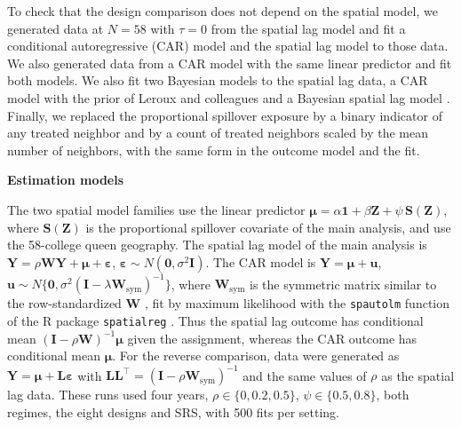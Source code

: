 \documentclass[11pt]{article}
\newcommand{\sihead}[1]{\par\medskip\noindent\textbf{#1}\par\nopagebreak\noindent\ignorespaces}
\begin{document}
To check that the design comparison does not depend on the spatial model, we generated data at $N = 58$ with $\tau = 0$ from the spatial lag model and fit a conditional autoregressive (CAR) model \citep{besag_spatial_1974, cressie_statistics_1993} and the spatial lag model to those data. We also generated data from a CAR model with the same linear predictor and fit both models. We also fit two Bayesian models to the spatial lag data, a CAR model with the prior of Leroux and colleagues \citep{leroux_estimation_2000, lee_carbayes_2013} and a Bayesian spatial lag model \citep{lesage_introduction_2009}. Finally, we replaced the proportional spillover exposure by a binary indicator of any treated neighbor and by a count of treated neighbors scaled by the mean number of neighbors, with the same form in the outcome model and the fit.

\sihead{Estimation models}
The two spatial model families use the linear predictor $\boldsymbol{\mu} = \alpha \mathbf{1} + \beta \mathbf{Z} + \psi\,\mathbf{S}(\mathbf{Z})$, where $\mathbf{S}(\mathbf{Z})$ is the proportional spillover covariate of the main analysis, and use the 58-college queen geography. The spatial lag model of the main analysis is $\mathbf{Y} = \rho \mathbf{W} \mathbf{Y} + \boldsymbol{\mu} + \boldsymbol{\varepsilon}$, $\boldsymbol{\varepsilon} \sim N(\mathbf{0}, \sigma^2 \mathbf{I})$. The CAR model is $\mathbf{Y} = \boldsymbol{\mu} + \mathbf{u}$, $\mathbf{u} \sim N\{\mathbf{0}, \sigma^2 (\mathbf{I} - \lambda \mathbf{W}_{\mathrm{sym}})^{-1}\}$, where $\mathbf{W}_{\mathrm{sym}}$ is the symmetric matrix similar to the row-standardized $\mathbf{W}$ \citep{ord_estimation_1975}, fit by maximum likelihood with the \texttt{spautolm} function of the R package \texttt{spatialreg} \citep{bivand_r_2022}. Thus the spatial lag outcome has conditional mean $(\mathbf{I}-\rho\mathbf{W})^{-1}\boldsymbol{\mu}$ given the assignment, whereas the CAR outcome has conditional mean $\boldsymbol{\mu}$. For the reverse comparison, data were generated as $\mathbf{Y} = \boldsymbol{\mu} + \mathbf{L}\boldsymbol{\varepsilon}$ with $\mathbf{L}\mathbf{L}^\top = (\mathbf{I} - \rho \mathbf{W}_{\mathrm{sym}})^{-1}$ and the same values of $\rho$ as the spatial lag data. These runs used four years, $\rho \in \{0, 0.2, 0.5\}$, $\psi \in \{0.5, 0.8\}$, both regimes, the eight designs and SRS, with 500 fits per setting.
\end{document}
